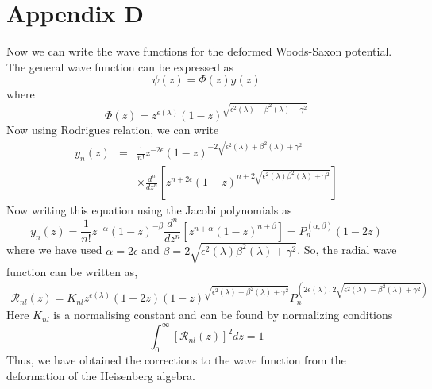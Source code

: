 \documentclass[12pt]{article}
\begin{document}
\section*{Appendix D}
Now we can write the   wave functions for the  deformed   Woods-Saxon  potential. The general wave function can be expressed as 
\begin{equation}
\psi(z)=\Phi(z)y(z)  
\end{equation}
where
\begin{equation}
\Phi(z)=z^{\epsilon(\lambda)}(1-z)^{\sqrt{\epsilon^2(\lambda)-\beta^2(\lambda)+\gamma^2}}
\end{equation}
Now using    Rodrigues relation, we can write 
\begin{eqnarray} \label{y_n}
y_n(z)&=&\frac{1}{n!}z^{-2\epsilon}(1-z)^{-2\sqrt{\epsilon^2(\lambda)+\beta^2(\lambda)+\gamma^2}} \nonumber \\ && \times \frac{d^n}{dz^n}\left[z^{n+2\epsilon}(1-z)^{n+2\sqrt{\epsilon^2(\lambda)\beta^2(\lambda)+\gamma^2}}\right]
\end{eqnarray}
Now writing this equation using the   Jacobi polynomials as 
\begin{equation} \label{y_jacobi}
	y_n(z) = \frac{1}{n!}z^{-\alpha}(1-z)^{-\beta}\frac{d^n}{dz^n}\left[z^{n+\alpha}(1-z)^{n+\beta}\right] = P_n^{\left(\alpha,\beta\right)}(1-2z)
\end{equation}
where we have used 
$
\alpha = 2\epsilon $ and $
\beta = 2\sqrt{\epsilon^2(\lambda)\beta^2(\lambda)+\gamma^2} $. 
So, the radial wave function can  be written as,
\begin{eqnarray} 
	\mathcal{R}_{nl}(z)=K_{nl}z^{\epsilon(\lambda)}(1-2z)(1-z)^{\sqrt{\epsilon^2(\lambda)-\beta^2(\lambda)+\gamma^2}} P_n^{(2\epsilon(\lambda),2\sqrt{\epsilon^2(\lambda)-\beta^2(\lambda)+\gamma^2})}
\end{eqnarray}
Here  $K_{nl}$ is a normalising constant and can be found by normalizing conditions
\begin{equation} \int_{0}^{\infty} \left[\mathcal{R}_{nl}(z)\right]^2  dz =1
\end{equation}
Thus, we have obtained the corrections to the wave function from the deformation of the Heisenberg algebra. 
 
\end{document}

